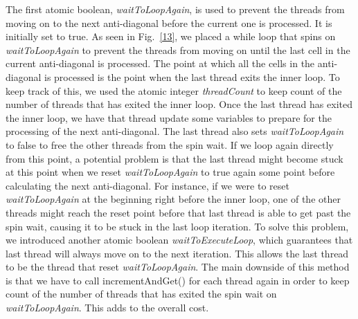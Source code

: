 \documentclass[conference]{IEEEtran}
\begin{document}
The first atomic boolean, \emph{waitToLoopAgain}, is used to prevent the threads from moving on to the next anti-diagonal before the current one is processed. It is initially set to true. As seen in Fig.~\ref{13}, we placed a while loop that spins on \emph{waitToLoopAgain} to prevent the threads from moving on until the last cell in the current anti-diagonal is processed. The point at which all the cells in the anti-diagonal is processed is the point when the last thread exits the inner loop. To keep track of this, we used the atomic integer \emph{threadCount} to keep count of the number of threads that has exited the inner loop. Once the last thread has exited the inner loop, we have that thread update some variables to prepare for the processing of the next anti-diagonal. The last thread also sets \emph{waitToLoopAgain} to false to free the other threads from the spin wait. If we loop again directly from this point, a potential problem is that the last thread might become stuck at this point when we reset \emph{waitToLoopAgain} to true again some point before calculating the next anti-diagonal. For instance, if we were to reset \emph{waitToLoopAgain} at the beginning right before the inner loop, one of the other threads might reach the reset point before that last thread is able to get past the spin wait, causing it to be stuck in the last loop iteration. To solve this problem, we introduced another atomic boolean \emph{waitToExecuteLoop}, which guarantees that last thread will always move on to the next iteration. This allows the last thread to be the thread that reset \emph{waitToLoopAgain}. The main downside of this method is that we have to call incrementAndGet() for each thread again in order to keep count of the number of threads that has exited the spin wait on \emph{waitToLoopAgain}. This adds to the overall cost.
\end{document}

